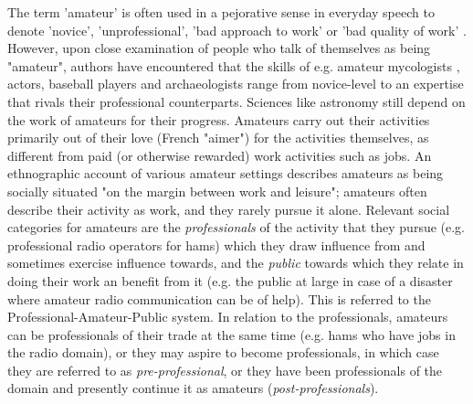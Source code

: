 \documentclass{acm_proc_article-sp}
\begin{document}
The term 'amateur' is often used in a pejorative sense in everyday speech to denote 'novice', 'unprofessional', 'bad approach to work' or 'bad quality of work' . However, upon close examination of people who talk of themselves as being "amateur", authors have encountered that the skills of e.g. amateur mycologists \cite{fine98}, actors, baseball players and archaeologists \cite{stebbins79} range from novice-level to an expertise that rivals their professional counterparts. Sciences like astronomy still depend on the work of amateurs for their progress. Amateurs carry out their activities primarily out of their love (French "aimer") for the activities themselves, as different from paid (or otherwise rewarded) work activities such as jobs. An ethnographic account of various amateur settings \cite{stebbins79} describes amateurs as being socially situated "on the margin between work and leisure"; amateurs often describe their activity as work, and they rarely pursue it alone. Relevant social categories for amateurs are the \textit{professionals} of the activity that they pursue (e.g. professional radio operators for hams) which they draw influence from and sometimes exercise influence towards, and the \textit{public} towards which they relate in doing their work an benefit from it (e.g. the public at large in case of a disaster where amateur radio communication can be of help). This is referred to the Professional-Amateur-Public system. In relation to the professionals, amateurs can be professionals of their trade at the same time (e.g. hams who have jobs in the radio domain), or they may aspire to become professionals, in which case they are referred to as \textit{pre-professional}, or they have been professionals of the domain and presently continue it as amateurs (\textit{post-professionals}).
\end{document}
